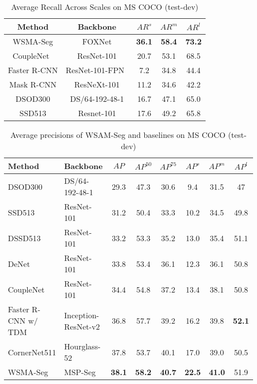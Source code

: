 \documentclass{article}
\begin{document}
{\begin{table*}[!ht]
\begin{small}
        \caption{Average Recall Across Scales on MS COCO (test-dev)\label{coco4}}
				\vspace{0.3em}
        \begin{tabular}{|c|c|c|c|c|}
          \hline
          Method&Backbone&$AR^{s}$&$AR^{m}$&$AR^{l}$\\\hline
          WSMA-Seg&FOXNet&\textbf{36.1}&\textbf{58.4}&\textbf{73.2}\\\hline
          CoupleNet~\cite{zhu2017couplenet}&ResNet-101&20.7&53.1&68.5\\\hline
Faster R-CNN&ResNet-101-FPN~\cite{lin2017feature}&7.2&34.8&44.4\\\hline
Mask R-CNN&ResNeXt-101&11.2&34.6&42.2\\\hline
DSOD300&DS/64-192-48-1&16.7&47.1&65.0\\\hline
          SSD513&Resnet-101&17.6&49.2&65.8\\\hline
          \end{tabular}\vspace{0.3em}
  \end{small}
\end{table*}
}










\begin{table*}[!ht]
   \centering
   \vspace{-0.5em}
	\caption{Average precisions of WSAM-Seg and baselines on MS COCO (test-dev)\label{coco_precision}}
\begin{small}
   \begin{tabular}{|l|l|c|c|c|c|c|c|}
   \hline
   Method&Backbone& $AP$ & $AP^{50}$ &$AP^{75}$&$AP^{s}$& $AP^{m}$& $AP^{l}$ \\\hline
   DSOD300&DS/64-192-48-1&29.3&47.3&30.6&9.4&31.5&47\\\hline
   SSD513&ResNet-101&31.2&50.4&33.3&10.2&34.5&49.8\\\hline
   DSSD513&ResNet-101&33.2&53.3&35.2&13.0&35.4&51.1\\\hline
   DeNet&ResNet-101&33.8&53.4&36.1&12.3&36.1&50.8\\\hline
   CoupleNet&ResNet-101&34.4&54.8&37.2&13.4&38.1&50.8\\\hline
   Faster R-CNN w/ TDM&Inception-ResNet-v2&36.8&57.7&39.2&16.2&39.8&\textbf{52.1}\\\hline
   CornerNet511&Hourglass-52&37.8&53.7&40.1&17.0&39.0&50.5\\\hline
   WSMA-Seg&MSP-Seg&\textbf{38.1}&\textbf{58.2}&\textbf{40.7}&\textbf{22.5}&\textbf{41.0}&51.9\\\hline
  \end{tabular}\end{small}
\end{table*}
\end{document}
